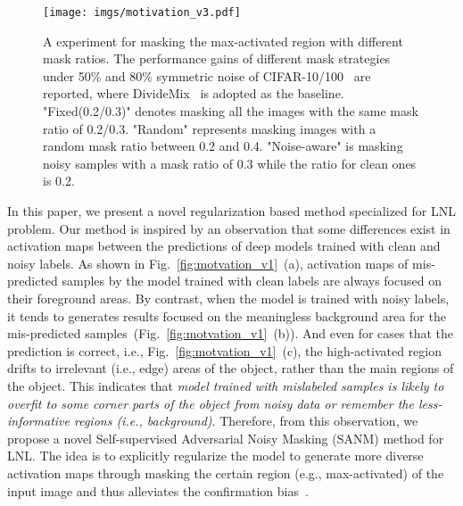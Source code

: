 \documentclass[10pt,twocolumn,letterpaper]{article}
\begin{document}
\begin{figure*}[!t]
 \centering
\small
 \begin{minipage}{1.0\textwidth}
    \centering
    \texttt{[image: imgs/motivation\_v3.pdf]}
\end{minipage}
\vspace{-2mm}
  \caption
    {
    \small
        {A experiment for masking the max-activated region with different mask ratios. The performance gains of different mask strategies under 50\% and 80\% symmetric noise of CIFAR-10/100~\cite{datasetcifar10} are reported}, where DivideMix~\cite{li2020dividemix} is adopted as the baseline. "Fixed(0.2/0.3)" denotes masking all the images with the same mask ratio of 0.2/0.3. "Random" represents masking images with a random mask ratio between 0.2 and 0.4. "Noise-aware" is masking noisy samples with a mask ratio of 0.3 while the ratio for clean ones is 0.2.   
      }
  \label{fig:motivation_work}
  \vspace{-4mm}
 \end{figure*}

  
In this paper, {we present a novel regularization based method specialized for LNL problem. Our method is inspired by an observation that some differences exist} in activation maps between the predictions of deep models trained with clean and noisy labels.
As shown in Fig.~\ref{fig:motvation_v1}~(a), activation maps of {mis-predicted} samples by the model trained with clean labels are always focused on their foreground areas. By contrast, {when} the model is trained with noisy labels, {it tends to} generates results focused on the meaningless background area {for the mis-predicted samples~(Fig.~\ref{fig:motvation_v1}~(b)). And even for cases that the prediction is correct, i.e., Fig.~\ref{fig:motvation_v1}~(c), the high-activated region drifts to irrelevant (i.e., edge) areas of the object, rather than the {main regions of the object}. This indicates that \emph{model trained with mislabeled samples is likely to overfit {to 
some corner parts of the object from} noisy data {or remember} the less-informative regions (i.e., background)}.}
Therefore, {from this observation}, we propose a novel Self-supervised Adversarial Noisy Masking (SANM) method for LNL. {The idea is to explicitly regularize the model to generate more diverse activation maps through masking the certain region (e.g., max-activated) of the input image}
and thus alleviates the confirmation bias~\cite{han2018co}.
\end{document}
